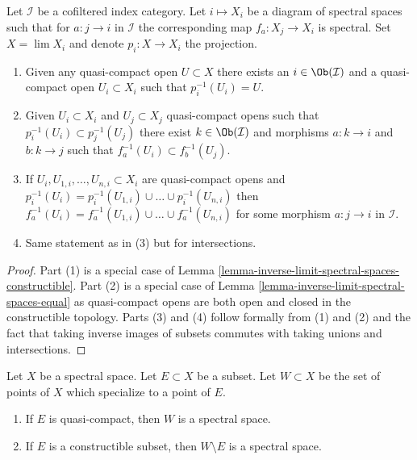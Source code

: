 \begin{lemma}
\label{lemma-descend-opens}
Let $\mathcal{I}$ be a cofiltered index category.
Let $i \mapsto X_i$ be a diagram of spectral spaces such
that for $a : j \to i$ in $\mathcal{I}$ the corresponding map
$f_a : X_j \to X_i$ is spectral. Set $X = \lim X_i$ and denote
$p_i : X \to X_i$ the projection.
\begin{enumerate}
\item Given any quasi-compact open $U \subset X$
there exists an $i \in \Ob(\mathcal{I})$ and a quasi-compact open
$U_i \subset X_i$ such that $p_i^{-1}(U_i) = U$.
\item Given $U_i \subset X_i$ and $U_j \subset X_j$
quasi-compact opens such that $p_i^{-1}(U_i) \subset p_j^{-1}(U_j)$
there exist $k \in \Ob(\mathcal{I})$ and morphisms
$a : k \to i$ and $b : k \to j$ such that $f_a^{-1}(U_i) \subset f_b^{-1}(U_j)$.
\item If $U_i, U_{1, i}, \ldots, U_{n, i} \subset X_i$ are quasi-compact
opens and
$p_i^{-1}(U_i) = p_i^{-1}(U_{1, i}) \cup \ldots \cup p_i^{-1}(U_{n, i})$
then
$f_a^{-1}(U_i) = f_a^{-1}(U_{1, i}) \cup \ldots \cup f_a^{-1}(U_{n, i})$
for some morphism $a : j \to i$ in $\mathcal{I}$.
\item Same statement as in (3) but for intersections.
\end{enumerate}
\end{lemma}

\begin{proof}
Part (1) is a special case of
Lemma \ref{lemma-inverse-limit-spectral-spaces-constructible}.
Part (2) is a special case of
Lemma \ref{lemma-inverse-limit-spectral-spaces-equal}
as quasi-compact opens are both open and closed in the constructible
topology. Parts (3) and (4) follow formally from (1) and (2)
and the fact that taking inverse images of subsets commutes with
taking unions and intersections.
\end{proof}

\begin{lemma}
\label{lemma-make-spectral-space}
Let $X$ be a spectral space. Let $E \subset X$ be a subset.
Let $W \subset X$ be the set of points of $X$ which specialize
to a point of $E$.
\begin{enumerate}
\item If $E$ is quasi-compact, then $W$ is a spectral space.
\item If $E$ is a constructible subset, then $W \setminus E$ is
a spectral space.
\end{enumerate}
\end{lemma}

